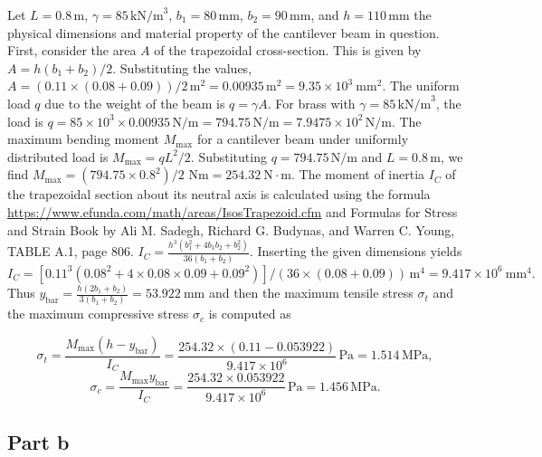 \documentclass[12pt]{article}
\begin{document}
Let \( L = 0.8 \, \text{m} \), \( \gamma = 85 \, \text{kN/m}^3 \), \( b_1 = 80 \, \text{mm} \), \( b_2 = 90 \, \text{mm} \), and \( h = 110 \, \text{mm} \) the physical dimensions and material property of the cantilever beam in question. First, consider the area \( A \) of the trapezoidal cross-section. This is given by \( A = h(b_1 + b_2)/2 \). Substituting the values, \( A = \left(0.11 \times (0.08 + 0.09)\right)/2 \, \text{m}^2 = 0.00935 \, \text{m}^2 =  9.35 \times 10^3 \mathrm{~mm}^2\). The uniform load \( q \) due to the weight of the beam is \( q = \gamma A \). For brass with \( \gamma = 85 \, \text{kN/m}^3 \), the load is \( q = 85 \times 10^3 \times 0.00935 \, \text{N/m} = 794.75 \, \text{N/m} = 7.9475 \times 10^2 \, \text{N/m} \). The maximum bending moment \( M_{\text{max}} \) for a cantilever beam under uniformly distributed load is \( M_{\text{max}} = q L^2 /2 \). Substituting \( q = 794.75 \, \text{N/m} \) and \( L = 0.8 \, \text{m} \), we find \( M_{\text{max}} = \left(794.75 \times 0.8^2\right)/2 \,\, \text{Nm} = 254.32 \mathrm{~N} \cdot \mathrm{m}\). The moment of inertia \( I_C \) of the trapezoidal section about its neutral axis is calculated using the formula \href{formula}{\url{https://www.efunda.com/math/areas/IsosTrapezoid.cfm}} and Formulas for Stress and Strain Book by Ali M. Sadegh, Richard G. Budynas, and Warren C. Young, TABLE A.1, page 806. \( I_C = \frac{h^3(b_1^2 + 4b_1b_2 + b_2^2)}{36(b_1 + b_2)} \). Inserting the given dimensions yields \( I_C = \left[0.11^3(0.08^2 + 4 \times 0.08 \times 0.09 + 0.09^2)\right]/\left(36 \times (0.08 + 0.09)\right) \, \text{m}^4 =9.417 \times 10^6 \mathrm{~mm}^4 .\) Thus \(y_{\mathrm{bar}}=\frac{h\left(2 b_1+b_2\right)}{3\left(b_1+b_2\right)}=53.922 \mathrm{~mm}\) and then the maximum tensile stress \( \sigma_t \) and the maximum compressive stress \( \sigma_c \) is computed as

\[
\sigma_t = \frac{M_{\text{max}}(h - y_{\text{bar}})}{I_C} = \frac{254.32 \times (0.11 - 0.053922)}{9.417 \times 10^6} \, \text{Pa} = 1.514 \, \text{MPa},
\]
\[
\sigma_c = \frac{M_{\text{max}} y_{\text{bar}}}{I_C} = \frac{254.32 \times 0.053922}{9.417 \times 10^6} \, \text{Pa} =1.456 \, \text{MPa}.
\]

\subsection*{Part b}
\end{document}
